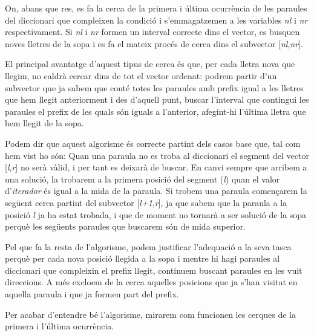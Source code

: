 \documentclass[titlepage]{article}
\begin{document}
On, abans que res, es fa la cerca de la primera i última ocurrència de les paraules del diccionari que compleixen la condició i s'emmagatzemen a les variables \textit{nl} i \textit{nr} respectivament. Si \textit{nl} i \textit{nr} formen un interval correcte dins el vector, es busquen noves lletres de la sopa i es fa el mateix procés de cerca dins el subvector [\textit{nl},\textit{nr}].\newline\par
El principal avantatge d'aquest tipus de cerca és que, per cada lletra nova que llegim, no caldrà cercar dins de tot el vector ordenat: podrem partir d'un subvector que ja sabem que conté totes les paraules amb prefix igual a les lletres que hem llegit anteriorment i des d'aquell punt, buscar l'interval que contingui les paraules el prefix de les quals són iguals a l'anterior, afegint-hi l'última lletra que hem llegit de la sopa.\newline\par
Podem dir que aquest  algorisme és correcte partint dels casos base que, tal com hem vist ho són: Quan una paraula no es troba al diccionari el segment del vector [\textit{l},\textit{r}] no serà vàlid, i per tant es deixarà de buscar. En canvi sempre que arribem a una solució, la trobarem a la primera posició del segment (\textit{l}) quan el valor d'\textit{iterador} és igual a la mida de la paraula. Si trobem una paraula començarem la següent cerca partint del subvector [\textit{l+1},\textit{r}], ja que sabem que la paraula a la posició \textit{l} ja ha estat trobada, i que de moment no tornarà a ser solució de la sopa perquè les següents paraules que buscarem són de mida superior.\par
Pel que fa la resta de l'algorisme, podem justificar l'adequació a la seva tasca perquè per cada nova posició llegida a la sopa i mentre hi hagi paraules al diccionari que compleixin el prefix llegit, continuem buscant paraules en les vuit direccions. A més excloem de la cerca aquelles posicions que ja s'han visitat en aquella paraula i que ja formen part del prefix.\newline

Per acabar d'entendre bé l'algorisme, mirarem com funcionen les cerques de la primera i l'última ocurrència.
\end{document}
